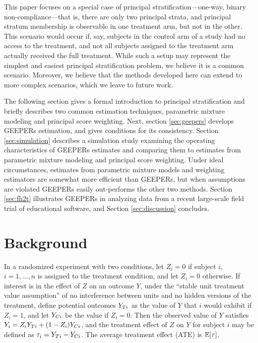 \documentclass{statsoc} %
\begin{document}
This paper focuses on a special case of principal stratification---one-way, binary non-compliance---that is, there are only two principal strata, and principal stratum membership is observable in one treatment arm, but not in the other.
This scenario would occur if, say, subjects in the control arm of a study had no access to the treatment, and not all subjects assigned to the treatment arm actually received the full treatment.
While such a setup may represent the simplest and easiest principal stratification problem, we believe it is a common scenario.
Moreover, we believe that the methods developed here can extend to more complex scenarios, which we leave to future work.

The following section gives a formal introduction to principal stratification and briefly describes two common estimation techniques, parametric mixture modeling and principal score weighting.
Next, section \ref{sec:geepers} develops GEEPERs estimation, and gives conditions for its consistency.
Section \ref{sec:simulation} describes a simulation study examining the operating characteristics of GEEPERs estimates and comparing them to estimates from parametric mixture modeling and principal score weighting.
Under ideal circumstances, estimates from parametric mixture models and weighting estimators are somewhat more efficient than GEEPERs, but when assumptions are violated GEEPERs easily out-performs the other two methods.
Section \ref{sec:fh2t} illustrates GEEPERs in analyzing data from a recent large-scale field trial of educational software, and Section \ref{sec:discussion} concludes.



\section{Background}
In a randomized experiment with two conditions, let $Z_i=0$ if subject $i$, $i=1,\dots,n$ is assigned to the treatment condition, and let $Z_i=0$ otherwise.
If interest is in the effect of $Z$ on an outcome $Y$, under the ``stable unit treatment value assumption'' \citep{air} of no interference between units and no hidden versions of the treatment, define potential outcomes \citep{splawa1990application,air} $Y_{Ti}$ as the value of $Y$ that $i$ would exhibit if $Z_i=1$, and let $Y_{Ci}$ be the value if $Z_i=0$. Then the observed value of $Y$ satisfies $Y_i=Z_iY_{Ti}+(1-Z_i)Y_{Ci}$, and the treatment effect of $Z$ on $Y$ for subject $i$ may be defined as $\tau_i=Y_{Ti}-Y_{Ci}$. The average treatment effect (ATE) is $\mathbb{E}[\tau]$. %
\end{document}
